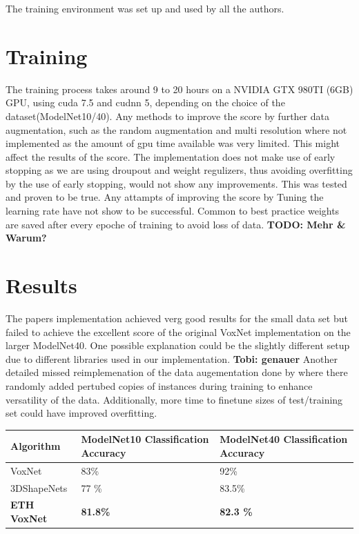 \documentclass[10pt,twocolumn,letterpaper]{article}
\begin{document}
The training environment was set up and used by all the authors. 

 
\section{Training}

The training process takes around 9 to 20 hours on a NVIDIA GTX 980TI (6GB) GPU, using cuda 7.5 and cudnn 5, depending on the choice of the dataset(ModelNet10/40). Any methods to improve the score by further data augmentation, such as the random augmentation and multi resolution where not implemented as the amount of gpu time available was very limited. This might affect the results of the score. 
The implementation does not make use of early stopping as we are using droupout and weight regulizers, thus avoiding overfitting by the use of early stopping, would not show any improvements. This was tested and proven to be true. Any attampts of improving the score by Tuning the learning rate have not show to be successful.
Common to best practice weights are saved after every epoche of training to avoid loss of data. \textbf{TODO: Mehr \& Warum?} \\ 

\section{Results}

The papers implementation achieved verg good results for the small data set but failed to achieve the excellent score of the 
original VoxNet implementation on the larger ModelNet40. One possible explanation could be the slightly different setup due 
to different libraries used in our implementation. \textbf{Tobi: genauer} Another detailed missed reimplemenation of the data 
augementation done by \cite{voxnet} where there randomly added pertubed copies of instances during training to enhance versatility of the data.
Additionally, more time to finetune sizes of test/training set could have improved overfitting.

\begin{center}
\begin{tabular}{ |p{2.3cm}||p{2.3cm}|p{2.3cm}|  }
 \hline
 Algorithm & ModelNet10 Classification Accuracy  & ModelNet40 Classification Accuracy \\
 \hline
 VoxNet \cite{voxnet}   & 83\% & 92\% \\
 3DShapeNets  \cite{shape}   & 77 \% & 83.5\% \\
\textbf{ETH VoxNet}    & \textbf{81.8\%}   & \textbf{82.3 \%}  \\
 \hline
\end{tabular}
\end{center}
\end{document}
